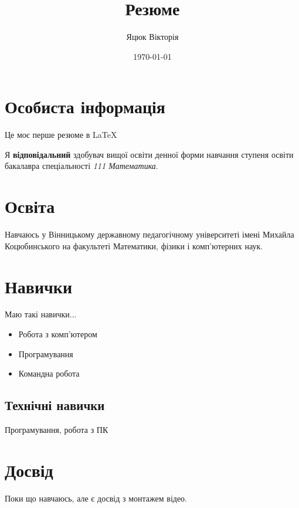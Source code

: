 \documentclass[12pt]{article}
\title{Резюме}
\author{Яцюк Вікторія}
\date{\today}
\begin{document}
\maketitle
\tableofcontents
\section{Особиста інформація}
\begin{center}
Це моє перше резюме в LaTeX
\end{center}
Я \textbf{відповідальний} здобувач вищої освіти денної форми навчання ступеня освіти бакалавра спеціальності \textit{111 Математика}.
\section{Освіта}
Навчаюсь у Вінницькому державному педагогічному університеті імені Михайла Коцюбинського на факультеті Математики, фізики і комп'ютерних наук.
\section{Навички}
Маю такі навички...
\begin{itemize}
\item Робота з комп’ютером
\item Програмування
\item Командна робота
\end{itemize}
\subsection{Технічні навички}
Програмування, робота з ПК
\section{Досвід}
Поки що навчаюсь, але є досвід з монтажем відео.
\end{document}
